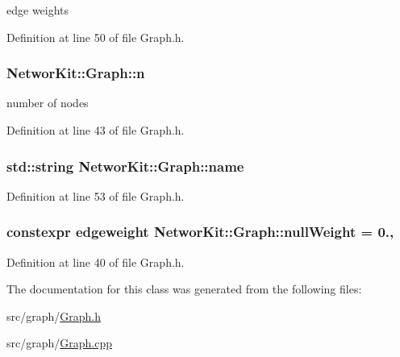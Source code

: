 edge weights 



Definition at line 50 of file Graph.\-h.

\hypertarget{class_networ_kit_1_1_graph_aae05e611d6d5eb42e045d374d73eb34a}{
\subsubsection[{n}]{ Networ\-Kit\-::\-Graph\-::n\hspace{0.3cm}{\ttfamily [protected]}}}\label{class_networ_kit_1_1_graph_aae05e611d6d5eb42e045d374d73eb34a}


number of nodes 



Definition at line 43 of file Graph.\-h.

\hypertarget{class_networ_kit_1_1_graph_aad1c9901bb8b7493df628469be54300a}{
\subsubsection[{name}]{\setlength{\rightskip}{0pt plus 5cm}std\-::string Networ\-Kit\-::\-Graph\-::name\hspace{0.3cm}{\ttfamily [protected]}}}\label{class_networ_kit_1_1_graph_aad1c9901bb8b7493df628469be54300a}


Definition at line 53 of file Graph.\-h.

\hypertarget{class_networ_kit_1_1_graph_a4b97f82f62865c47a7a2e1309f90c676}{
\subsubsection[{null\-Weight}]{\setlength{\rightskip}{0pt plus 5cm}constexpr {\bf edgeweight} Networ\-Kit\-::\-Graph\-::null\-Weight = 0.\hspace{0.3cm}{\ttfamily [static]}, {\ttfamily [protected]}}}\label{class_networ_kit_1_1_graph_a4b97f82f62865c47a7a2e1309f90c676}


Definition at line 40 of file Graph.\-h.



The documentation for this class was generated from the following files\-:\begin{DoxyCompactItemize}
\item 
src/graph/\hyperlink{_graph_8h}{Graph.\-h}\item 
src/graph/\hyperlink{_graph_8cpp}{Graph.\-cpp}\end{DoxyCompactItemize}
